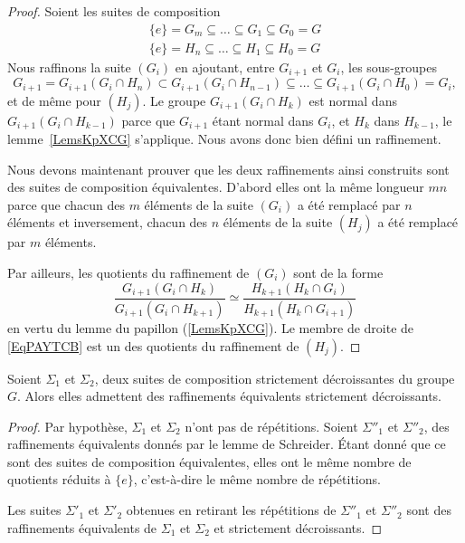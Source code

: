 \begin{proof}
	Soient les suites de composition
	\begin{subequations}
		\begin{align}
			\{ e \}=G_m\subseteq\ldots\subseteq G_1\subseteq G_0=G \\
			\{ e \}=H_n\subseteq\ldots\subseteq H_1\subseteq H_0=G
		\end{align}
	\end{subequations}
	Nous raffinons la suite \( (G_i)\) en ajoutant, entre \( G_{i+1}\) et \( G_i\), les sous-groupes
	\begin{equation}
		G_{i+1}=G_{i+1}(G_i\cap H_n)\subset G_{i+1}(G_i\cap H_{n-1})\subseteq\ldots\subseteq G_{i+1}(G_i\cap H_0)=G_i,
	\end{equation}
	et de même pour \( (H_j)\). Le groupe \( G_{i+1}(G_i\cap H_k)\) est normal dans \( G_{i+1}(G_i\cap H_{k-1})\) parce que \( G_{i+1}\) étant normal dans \( G_i\), et \( H_k\) dans \( H_{k-1}\), le lemme~\ref{LemsKpXCG} s'applique. Nous avons donc bien défini un raffinement.

	Nous devons maintenant prouver que les deux raffinements ainsi construits sont des suites de composition équivalentes. D'abord elles ont la même longueur \( mn\) parce que chacun des \( m\) éléments de la suite \( (G_i)\) a été remplacé par \( n\) éléments et inversement, chacun des \( n\) éléments de la suite \( (H_j)\) a été remplacé par \( m\) éléments.

	Par ailleurs, les quotients du raffinement de \( (G_i)\) sont de la forme
	\begin{equation}    \label{EqPAYTCB}
		\frac{ G_{i+1}(G_i \cap H_k) }{ G_{i+1}(G_i\cap H_{k+1}) }\simeq \frac{ H_{k+1}(H_k\cap G_i) }{ H_{k+1}(H_k\cap G_{i+1}) }
	\end{equation}
	en vertu du lemme du papillon (\ref{LemsKpXCG}). Le membre de droite de \eqref{EqPAYTCB} est un des quotients du raffinement de \( (H_j)\).
\end{proof}

\begin{lemma}    \label{LemBSicRJ}
	Soient \( \Sigma_1\) et \( \Sigma_2\), deux suites de composition strictement décroissantes du groupe \( G\). Alors elles admettent des raffinements équivalents strictement décroissants.
\end{lemma}

\begin{proof}
	Par hypothèse, \( \Sigma_1\) et \( \Sigma_2\) n'ont pas de répétitions. Soient \( \Sigma''_1\) et \( \Sigma''_2\), des raffinements équivalents donnés par le lemme de Schreider. Étant donné que ce sont des suites de composition équivalentes, elles ont le même nombre de quotients réduits à \( \{ e \}\), c'est-à-dire le même nombre de répétitions.

	Les suites \( \Sigma'_1\) et \( \Sigma'_2\) obtenues en retirant les répétitions de \( \Sigma''_1\) et \( \Sigma''_2\) sont des raffinements équivalents de \( \Sigma_1\) et \( \Sigma_2\) et strictement décroissants.
\end{proof}

